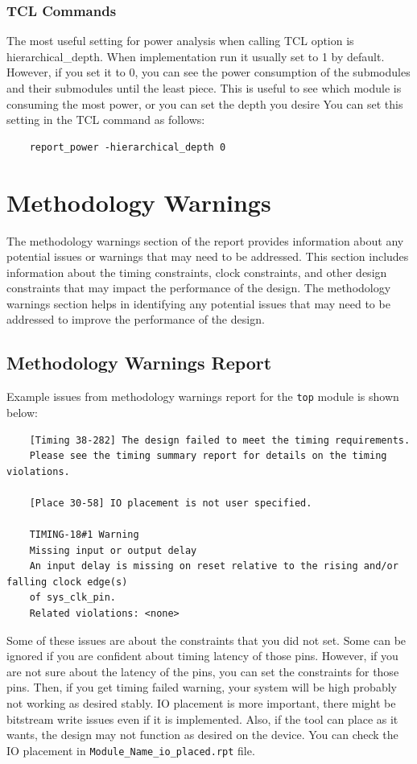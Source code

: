 \documentclass{report}
\begin{document}
\subsection{TCL Commands}
The most useful setting for power analysis when calling TCL option is hierarchical\_depth. When implementation run it usually set to 1 by default. However, if you set it to 0, you can see the power consumption of the submodules and their submodules until the least piece. This is useful to see which module is consuming the most power, or you can set the depth you desire You can set this setting in the TCL command as follows:

\begin{verbatim}
    report_power -hierarchical_depth 0
\end{verbatim}

\chapter{Methodology Warnings}
The methodology warnings section of the report provides information about any potential issues or warnings that may need to be addressed. This section includes information about the timing constraints, clock constraints, and other design constraints that may impact the performance of the design. The methodology warnings section helps in identifying any potential issues that may need to be addressed to improve the performance of the design.

\section{Methodology Warnings Report}
Example issues from methodology warnings report for the \texttt{top} module is shown below:
\begin{verbatim}
    [Timing 38-282] The design failed to meet the timing requirements. 
    Please see the timing summary report for details on the timing violations.

    [Place 30-58] IO placement is not user specified.

    TIMING-18#1 Warning
    Missing input or output delay  
    An input delay is missing on reset relative to the rising and/or falling clock edge(s) 
    of sys_clk_pin.
    Related violations: <none>
\end{verbatim}
Some of these issues are about the constraints that you did not set. Some can be ignored if you are confident about timing latency of those pins. However, if you are not sure about the latency of the pins, you can set the constraints for those pins. Then, if you get timing failed warning, your system will be high probably not working as desired stably. IO placement is more important, there might be bitstream write issues even if it is implemented. Also, if the tool can place as it wants, the design may not function as desired on the device. You can check the IO placement in \texttt{Module\_Name\_io\_placed.rpt} file.
\end{document}
